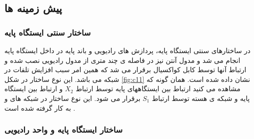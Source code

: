 \subsection{پیش زمینه ها} 
\subsubsection{ساختار سنتی ایستگاه پایه }

در ساختارهای سنتی ایستگاه پایه، پردازش های رادیویی و باند پایه در
داخل ایستگاه پایه انجام می شد و مدول آنتن نیز در فاصله
ی چند متری از مدول رادیویی نصب شده و ارتباط آنها
توسط کابل کواکسیال برقرار می شد که همین امر سبب
افزایش تلفات در شبکه می باشد. این نوع ساختار در شکل
\ref{fig:c11} نشان داده شده است. همان گونه که مشاهده می کنید
ارتباط بین ایستگاههای پایه توسط ارتباط  $X_2$ و ارتباط بین
ایستگاه پایه و شبکه ی هسته توسط ارتباط $ S_1$ برقرار می
شود. این نوع ساختار در شبکه های  و  به کار گرفته
شده است 
\cite{checko2015cloud}.

\subsubsection{ ساختار ایستگاه پایه و واحد رادیویی}

